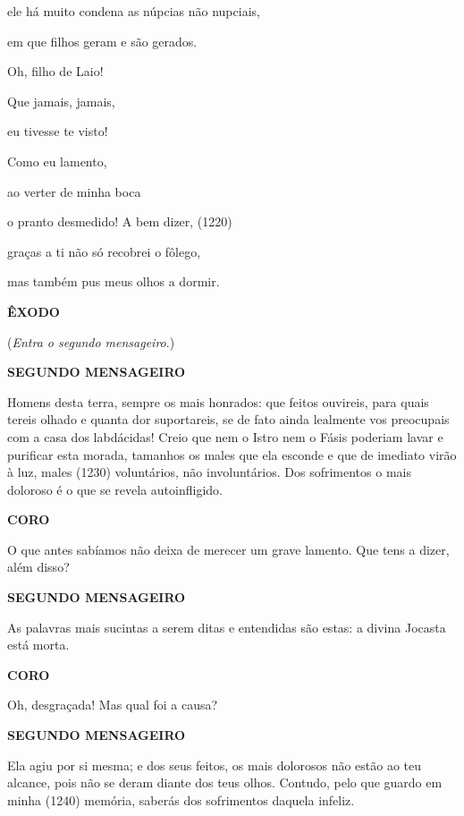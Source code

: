 ele há muito condena as núpcias não nupciais,

em que filhos geram e são gerados.

Oh, filho de Laio!

Que jamais, jamais,

eu tivesse te visto!

Como eu lamento,

ao verter de minha boca

o pranto desmedido! A bem dizer, (1220)

graças a ti não só recobrei o fôlego,

mas também pus meus olhos a dormir.

\textbf{ÊXODO}

(\emph{Entra o segundo mensageiro}.)

\textbf{SEGUNDO MENSAGEIRO}

Homens desta terra, sempre os mais honrados: que feitos ouvireis, para
quais tereis olhado e quanta dor suportareis, se de fato ainda lealmente
vos preocupais com a casa dos labdácidas! Creio que nem o Istro nem o
Fásis poderiam lavar e purificar esta morada, tamanhos os males que ela
esconde e que de imediato virão à luz, males (1230) voluntários, não
involuntários. Dos sofrimentos o mais doloroso é o que se revela
autoinfligido.

\textbf{CORO}

O que antes sabíamos não deixa de merecer um grave lamento. Que tens a
dizer, além disso?

\textbf{SEGUNDO MENSAGEIRO}

As palavras mais sucintas a serem ditas e entendidas são estas: a divina
Jocasta está morta.

\textbf{CORO}

Oh, desgraçada! Mas qual foi a causa?

\textbf{SEGUNDO MENSAGEIRO}

Ela agiu por si mesma; e dos seus feitos, os mais dolorosos não estão ao
teu alcance, pois não se deram diante dos teus olhos. Contudo, pelo que
guardo em minha (1240) memória, saberás dos sofrimentos daquela infeliz.


